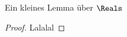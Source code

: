 
\begin{lemma}
	\label{labelit}
	Ein kleines Lemma über $\Reals$
\end{lemma}
\begin{proof}
	Lalalal
\end{proof}
